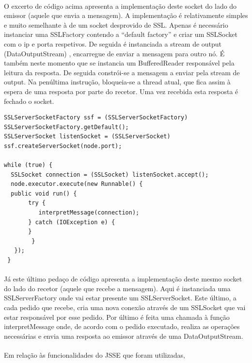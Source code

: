 \documentclass[11pt,oneside]{book}
\begin{document}
\paragraph{}
    O excerto de código acima apresenta a implementação deste socket do lado do emissor 
    (aquele que envia a mensagem).  A implementação é relativamente simples e muito semelhante
    à de um socket desprovido de SSL. Apenas é necessário instanciar uma SSLFactory contendo a
    “default factory” e criar um SSLSocket com o ip e porta respetivos. De seguida é instanciada
    a stream de output (DataOutputStream) , encarregue de enviar a mensagem para outro nó. É 
    também neste momento que se instancia um BufferedReader responsável pela leitura da resposta. 
    De seguida constrói-se a mensagem a enviar pela stream de output. Na penúltima instrução, 
    bloqueia-se a thread atual, que fica assim à espera de uma resposta por parte do recetor. 
    Uma vez recebida esta resposta é fechado o socket.


\begin{lstlisting}
SSLServerSocketFactory ssf = (SSLServerSocketFactory) SSLServerSocketFactory.getDefault();
SSLServerSocket listenSocket = (SSLServerSocket) ssf.createServerSocket(node.port);

while (true) {
  SSLSocket connection = (SSLSocket) listenSocket.accept();
  node.executor.execute(new Runnable() {
  public void run() {
       try {
          interpretMessage(connection);
       } catch (IOException e) {
       }
        }
   });
 }

\end{lstlisting}

\paragraph{}
    Já este último pedaço de código apresenta a implementação deste mesmo socket do lado do recetor
    (aquele que recebe a mensagem). Aqui é instanciada uma SSLServerFactory onde vai estar presente 
    um SSLServerSocket.  Este último, a cada pedido que recebe, cria uma nova conexão através de um 
    SSLSocket que vai estar responsável por esse pedido. Por último é feita uma chamada à função 
    interpretMessage onde, de acordo com o pedido executado, realiza as operações necessárias e envia
    uma resposta ao emissor através de uma DataOutputStream.

\paragraph{}
    Em relação às funcionalidades do JSSE que foram utilizadas, 
\end{document}
